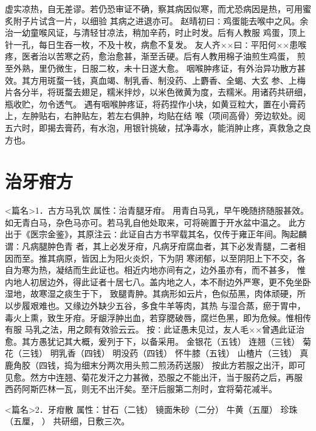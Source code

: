 \documentclass[a4paper,12pt,UTF8,twoside]{ctexbook}
\begin{document}
虚实凉热，自无差谬。若仍恐审证不确，察其病因似寒，而尤恐病因是热，可用蜜炙附子片试含一片，以细验 
其病之进退亦可。 
赵晴初曰∶鸡蛋能去喉中之风。余治一幼童喉风证，与清轻甘凉法，稍加辛药，时止时发。后有人教服 
鸡蛋，顶上针一孔，每日生吞一枚，不及十枚，病愈不复发。 
友人齐××曰∶平阳何××患喉疼，医者治以苦寒之药，愈治愈甚，渐至舌硬。后有人教用棉子油煎生鸡蛋， 
煎至外熟，里仍微生，日服二枚，未十日遂大愈。 
咽喉肿疼证，有外治异功散方甚效。其方用斑蝥一钱，真血竭、制乳香、制没药、上麝香、全蝎、大玄 
参、上梅片各分半，将斑蝥去翅足，糯米拌炒，以米色微黄为度，去糯米。用诸药共研细，瓶收贮，勿令透气。 
遇有咽喉肿疼证，将药捏作小块，如黄豆粒大，置在小膏药上，左肿贴右，右肿贴左，若左右俱肿，均贴在结 
喉（项间高骨）旁边软处。阅五六时，即揭去膏药，有水泡，用银针挑破，拭净毒水，能消肿止疼，真救急之良方也。 

\chapter{治牙疳方}
<篇名>1．古方马乳饮
属性：治青腿牙疳。 
用青白马乳，早午晚随挤随服甚效。如无青白马，杂色马亦可。若马乳自他处取来，可将碗置于开水盆中温之。 
此方出于《医宗金鉴》，其原注云∶此证自古方书罕载其名，仅传于雍正年间。陶起麟谓∶凡病腿肿色青 
者，其上必发牙疳，凡病牙疳腐血者，其下必发青腿，二者相因而至。推其病原，皆因上为阳火炎炽，下为阴 
寒闭郁，以至阴阳上下不交，各自为寒为热，凝结而生此证也。相近内地亦间有之，边外虽亦有，而不甚多， 
惟内地人初居边外，得此证者十居七八。盖内地之人，本不耐边外严寒，更不免坐卧湿地，故寒湿之痰生于下， 
致腿青肿。其病形如云片，色似茄黑，肉体顽硬，所以步履艰难也。又缘边外缺少五谷，多食牛羊等肉，其热 
与湿合蒸，瘀于胃中，毒火上熏，致生牙疳。牙龈浮肿出血，若穿腮破唇，腐烂色黑，即为危候。惟相传有服 
马乳之法，用之颇有效验云云。 
按∶此证愚未见过，友人毛××曾遇此证治愈。其方愚犹记其大概，爰列于下，以备采用。 
金银花（五钱） 连翘（三钱） 菊花（三钱） 明乳香（四钱） 明没药（四钱） 怀牛膝（五钱） 
山楂片（三钱） 真鹿角胶（四钱，捣为细末分两次用头煎二煎汤药送服） 
按此方若服之出汗，即可见愈。然方中连翘、菊花发汗之力甚微，恐服之不能出汗，当于服药之后，再服 
西药阿斯匹林一瓦，则无不出汗矣。至汗后服第二剂时，宜将菊花减半。 


<篇名>2．牙疳散
属性：甘石（二钱） 镜面朱砂（二分） 牛黄（五厘） 珍珠（五厘， ） 
共研细，日敷三次。 
\end{document}
